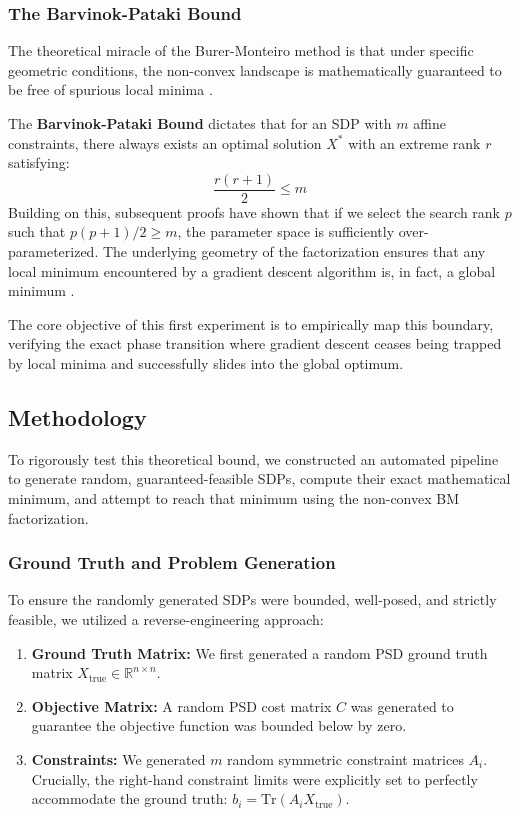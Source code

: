 \subsubsection{The Barvinok-Pataki Bound}
The theoretical miracle of the Burer-Monteiro method is that under specific geometric conditions, the non-convex landscape is mathematically guaranteed to be free of spurious local minima \cite{cifuentes2022polynomial}. 

The \textbf{Barvinok-Pataki Bound} \cite{barvinok1995problems, pataki1998rank} dictates that for an SDP with $m$ affine constraints, there always exists an optimal solution $X^*$ with an extreme rank $r$ satisfying:
\begin{equation}
    \frac{r(r+1)}{2} \le m
\end{equation}
Building on this, subsequent proofs have shown that if we select the search rank $p$ such that $p(p+1)/2 \ge m$, the parameter space is sufficiently over-parameterized. The underlying geometry of the factorization ensures that any local minimum encountered by a gradient descent algorithm is, in fact, a global minimum \cite{sahiner2022scaling, cifuentes2022polynomial}. 

The core objective of this first experiment is to empirically map this boundary, verifying the exact phase transition where gradient descent ceases being trapped by local minima and successfully slides into the global optimum.

\subsection{Methodology}
To rigorously test this theoretical bound, we constructed an automated pipeline to generate random, guaranteed-feasible SDPs, compute their exact mathematical minimum, and attempt to reach that minimum using the non-convex BM factorization.

\subsubsection{Ground Truth and Problem Generation}
To ensure the randomly generated SDPs were bounded, well-posed, and strictly feasible, we utilized a reverse-engineering approach:
\begin{enumerate}
    \item \textbf{Ground Truth Matrix:} We first generated a random PSD ground truth matrix $X_{\text{true}} \in \mathbb{R}^{n \times n}$.
    \item \textbf{Objective Matrix:} A random PSD cost matrix $C$ was generated to guarantee the objective function was bounded below by zero.
    \item \textbf{Constraints:} We generated $m$ random symmetric constraint matrices $A_i$. Crucially, the right-hand constraint limits were explicitly set to perfectly accommodate the ground truth: $b_i = \text{Tr}(A_i X_{\text{true}})$. 
\end{enumerate}

